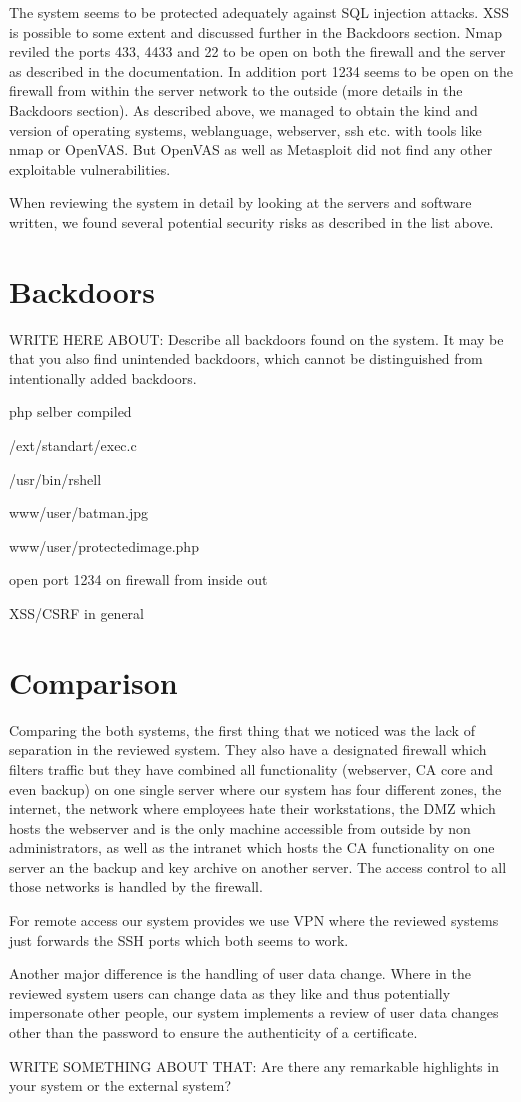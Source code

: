 \documentclass{report}
\begin{document}
The system seems to be protected adequately against SQL injection attacks. XSS is possible to some extent and discussed further in the Backdoors section. Nmap reviled the ports 433, 4433 and 22 to be open on both the firewall and the server as described in the documentation. In addition port 1234 seems to be open on the firewall from within the server network to the outside (more details in the Backdoors section). As described above, we managed to obtain the kind and version of operating systems, weblanguage, webserver, ssh etc. with tools like nmap or OpenVAS. But OpenVAS as well as Metasploit did not find any other exploitable vulnerabilities.

When reviewing the system in detail by looking at the servers and software written, we found several potential security risks as described in the list above.
\section{Backdoors}

WRITE HERE ABOUT: 
Describe all backdoors found on the system. 
It may be that you also find unintended backdoors, which cannot be distinguished from intentionally added backdoors.


php selber compiled


/ext/standart/exec.c


/usr/bin/rshell


www/user/batman.jpg


www/user/protectedimage.php


open port 1234 on firewall from inside out


XSS/CSRF in general


\section{Comparison}

Comparing the both systems, the first thing that we noticed was the lack of separation in the reviewed system. They also have a designated firewall which filters traffic but they have combined all functionality (webserver, CA core and even backup) on one single server where our system has four different zones, the internet, the network where employees hate their workstations, the DMZ which hosts the webserver and is the only machine accessible from outside by non administrators, as well as the intranet which hosts the CA functionality on one server an the backup and key archive on another server. The access control to all those networks is handled by the firewall.

For remote access our system provides we use VPN where the reviewed systems just forwards the SSH ports which both seems to work.

Another major difference is the handling of user data change. Where in the reviewed system users can change data as they like and thus potentially impersonate other people, our system implements a review of user data changes other than the password to ensure the authenticity of a certificate.

WRITE SOMETHING ABOUT THAT: Are there any remarkable highlights in your system or the external system?
\end{document}
